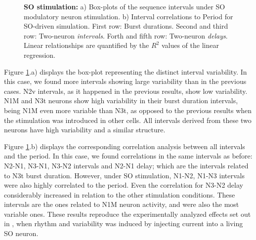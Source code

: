 \begin{figure}[hbt!]
\begin{minipage}[b]{0.53\textwidth}
\begin{minipage}[b]{\textwidth}
		\end{minipage}
	\end{minipage}
	\caption{\textbf{SO stimulation: }a) Box-plots of the sequence intervals under SO modulatory neuron stimulation. b) Interval correlations to Period for SO-driven simulation. First row: Burst durations. Second and third row: Two-neuron \textit{intervals}. Forth and fifth row: Two-neuron \textit{delays}. Linear relationships are quantified by the $R^2$ values of the linear regression.}
	\label{fig:invariant so}
\end{figure}


Figure \ref{fig:invariant so}.a) displays the box-plot representing the distinct interval variability. In this case, we found more intervals showing large variability than in the previous cases. N2v intervals, as it happened in the previous results, show low variability. %
N1M and N3t neurons show high variability in their burst duration intervals, being N1M even more variable than N3t, as opposed to the previous results when the stimulation was introduced in other cells. All intervals derived from these two neurons have high variability and a similar structure. %




Figure \ref{fig:invariant so}.b) displays the corresponding correlation analysis between all intervals and the period. %
In this case, we found correlations in the same intervals as before: N2-N1, N3-N1, N3-N2 intervals and N2-N1 delay; which are the intervals related to N3t burst duration. However, under SO stimulation,  N1-N2, N1-N3 intervals were also highly correlated to the period. Even the correlation for N3-N2 delay considerably increased in relation to the other stimulation conditions. These intervals are the ones related to N1M neuron activity, and were also the most variable ones.  These results reproduce the experimentally analyzed effects set out in \parencite{elliott_temporal_1991}, when rhythm and variability was induced by injecting current into a living SO neuron.

